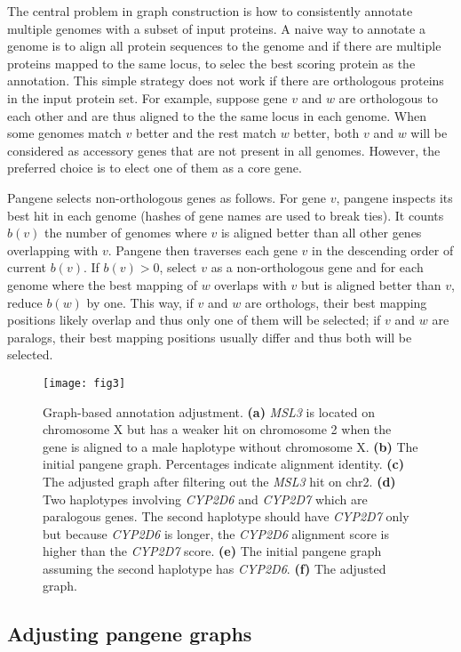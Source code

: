 \documentclass[webpdf,contemporary,large,namedate]{oup-authoring-template}%
\begin{document}
The central problem in graph construction is how to consistently annotate multiple genomes with a subset of input proteins.
A naive way to annotate a genome is to align all protein sequences to the genome
and if there are multiple proteins mapped to the same locus, to selec the best scoring protein as the annotation.
This simple strategy does not work if there are orthologous proteins in the input protein set.
For example, suppose gene $v$ and $w$ are orthologous to each other and are thus aligned to the the same locus in each genome.
When some genomes match $v$ better and the rest match $w$ better,
both $v$ and $w$ will be considered as accessory genes that are not present in all genomes.
However, the preferred choice is to elect one of them as a core gene.

Pangene selects non-orthologous genes as follows.
For gene $v$, pangene inspects its best hit in each genome (hashes of gene names are used to break ties).
It counts $b(v)$ the number of genomes where $v$ is aligned better than all other genes overlapping with $v$.
Pangene then traverses each gene $v$ in the descending order of current $b(v)$.
If $b(v)>0$, select $v$ as a non-orthologous gene and for each genome where the best mapping of $w$ overlaps with $v$ but is aligned better than $v$, reduce $b(w)$ by one.
This way, if $v$ and $w$ are orthologs, their best mapping positions likely overlap and thus only one of them will be selected;
if $v$ and $w$ are paralogs, their best mapping positions usually differ and thus both will be selected.

\begin{figure}[tb!]
\centering
\texttt{[image: fig3]}
\caption{Graph-based annotation adjustment.
{\bf (a)} \emph{MSL3} is located on chromosome X but has a weaker hit on chromosome 2 when the gene
is aligned to a male haplotype without chromosome X.
{\bf (b)} The initial pangene graph. Percentages indicate alignment identity.
{\bf (c)} The adjusted graph after filtering out the \emph{MSL3} hit on chr2.
{\bf (d)} Two haplotypes involving \emph{CYP2D6} and \emph{CYP2D7} which are paralogous genes.
The second haplotype should have \emph{CYP2D7} only but because \emph{CYP2D6} is longer, the \emph{CYP2D6} alignment score is higher than the \emph{CYP2D7} score.
{\bf (e)} The initial pangene graph assuming the second haplotype has \emph{CYP2D6}.
{\bf (f)} The adjusted graph.
}\label{fig:resolve}
\end{figure}

\subsection{Adjusting pangene graphs}
\end{document}
